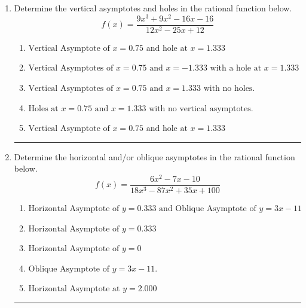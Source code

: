 \documentclass[14pt]{extbook}
\newcommand{\litem}[1]{\item#1\hspace*{-1cm}\rule{\textwidth}{0.4pt}}
\begin{document}
\begin{enumerate}
{\begin{enumerate}[label=\Alph*.]
\end{enumerate} }
\litem{
Determine the vertical asymptotes and holes in the rational function below.\[ f(x) = \frac{9x^{3} +9 x^{2} -16 x -16}{12x^{2} -25 x + 12} \]\begin{enumerate}[label=\Alph*.]
\item \( \text{Vertical Asymptote of } x = 0.75 \text{ and hole at } x = 1.333 \)
\item \( \text{Vertical Asymptotes of } x = 0.75 \text{ and } x = -1.333 \text{ with a hole at } x = 1.333 \)
\item \( \text{Vertical Asymptotes of } x = 0.75 \text{ and } x = 1.333 \text{ with no holes.} \)
\item \( \text{Holes at } x = 0.75 \text{ and } x = 1.333 \text{ with no vertical asymptotes.} \)
\item \( \text{Vertical Asymptote of } x = 0.75 \text{ and hole at } x = 1.333 \)

\end{enumerate} }
\litem{
Determine the horizontal and/or oblique asymptotes in the rational function below.\[ f(x) = \frac{6x^{2} -7 x -10}{18x^{3} -87 x^{2} +35 x + 100} \]\begin{enumerate}[label=\Alph*.]
\item \( \text{Horizontal Asymptote of } y = 0.333 \text{ and Oblique Asymptote of } y = 3x -11 \)
\item \( \text{Horizontal Asymptote of } y = 0.333  \)
\item \( \text{Horizontal Asymptote of } y = 0 \)
\item \( \text{Oblique Asymptote of } y = 3x -11. \)
\item \( \text{Horizontal Asymptote at } y = 2.000 \)


\end{enumerate}}
\end{enumerate}
\end{document}
